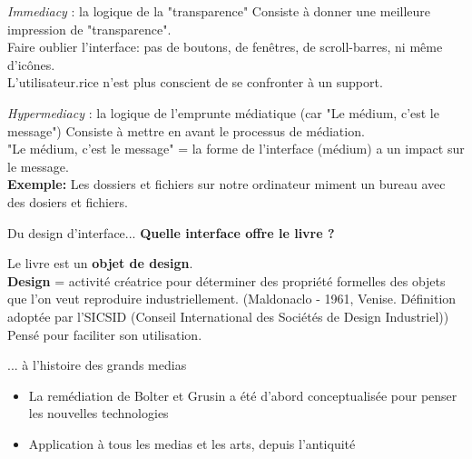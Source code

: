 \begin{frame}{\textit{Immediacy} : la logique de la "transparence"}
    Consiste à donner une meilleure impression de "transparence".\\
    \textrightarrow{} Faire oublier l'interface: pas de boutons, de fenêtres, de scroll-barres, ni même d'icônes.\\
    \textrightarrow{} L'utilisateur.rice n'est plus conscient de se confronter à un support.
\end{frame}

\begin{frame}{\textit{Hypermediacy} : la logique de l'emprunte médiatique (car "Le médium, c'est le message")}
    Consiste à mettre en avant le processus de médiation.\\ 
    \textrightarrow{} "Le médium, c'est le message" = la forme de l'interface (médium) a un impact sur le message.\\
    \textbf{Exemple:} Les dossiers et fichiers sur notre ordinateur miment un bureau avec des dosiers et fichiers.
\end{frame}

\begin{frame}{Du design d'interface...}
\textbf{Quelle interface offre le livre ?}\\
\vspace{2em} 

Le livre est un \textbf{objet de design}. \\
\vspace{2em}
\textbf{Design} =  activité créatrice pour déterminer des propriété formelles des objets que l'on veut reproduire industriellement. (Maldonaclo - 1961, Venise. Définition adoptée par l'SICSID (Conseil International des Sociétés de Design Industriel))\\
\textrightarrow{} Pensé pour faciliter son utilisation.

\end{frame}

\begin{frame}{... à l'histoire des grands medias}
    \begin{itemize}
        \item La remédiation de Bolter et Grusin a été d'abord conceptualisée pour penser les nouvelles technologies
        \item Application à tous les medias et les arts, depuis l'antiquité
    \end{itemize}
\end{frame}

